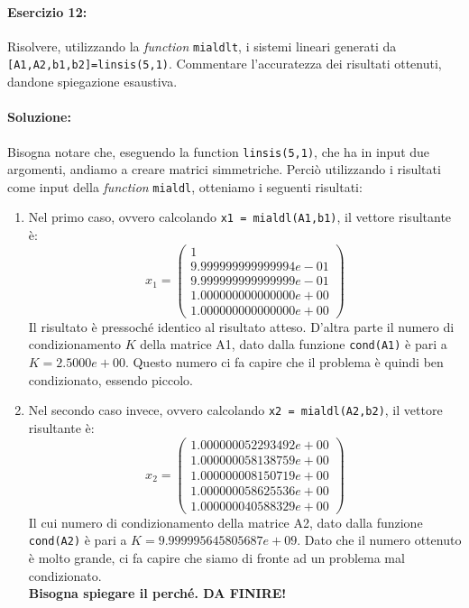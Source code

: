 \documentclass[12pt]{article}
\begin{document}
\paragraph{Esercizio 12:} Risolvere, utilizzando la \textit{function} \texttt{mialdlt}, i sistemi lineari generati da\\ \texttt{[A1,A2,b1,b2]=linsis(5,1)}. 
Commentare l’accuratezza dei risultati ottenuti, dandone spiegazione esaustiva.
\paragraph{Soluzione:}
Bisogna notare che, eseguendo la function \texttt{linsis(5,1)}, che ha in input due
 argomenti, andiamo a creare matrici simmetriche. Perciò utilizzando i risultati come input
della \textit{function} \texttt{mialdl}, otteniamo i seguenti risultati:
\begin{enumerate}
    \item Nel primo caso, ovvero calcolando \texttt{x1 = mialdl(A1,b1)}, il vettore risultante è: 
    \begin{equation*} x_1=
        \begin{pmatrix}
            1\\
            9.999999999999994e-01\\
            9.999999999999999e-01\\
            1.000000000000000e+00\\
            1.000000000000000e+00
        \end{pmatrix}
    \end{equation*}
    Il risultato è pressoché identico al risultato atteso. D'altra parte il numero di condizionamento \(K\) della matrice A1, dato dalla funzione \texttt{cond(A1)}
    è pari a \(K = 2.5000e+00\). Questo numero ci fa capire che il problema è quindi ben condizionato, essendo piccolo.
    \item Nel secondo caso invece, ovvero calcolando \texttt{x2 = mialdl(A2,b2)}, il vettore risultante è:
    \begin{equation*} x_2=
        \begin{pmatrix}
            1.000000052293492e+00\\
            1.000000058138759e+00\\
            1.000000008150719e+00\\
            1.000000058625536e+00\\
            1.000000040588329e+00
        \end{pmatrix}
    \end{equation*}
    Il cui numero di condizionamento della matrice A2, dato dalla funzione \texttt{cond(A2)} è pari a \(K = 9.999995645805687e+09\). Dato che il numero ottenuto è molto 
    grande, ci fa capire che siamo di fronte ad un problema mal condizionato. \\
    \textbf{Bisogna spiegare il perché. DA FINIRE!}
\end{enumerate}
\end{document}
